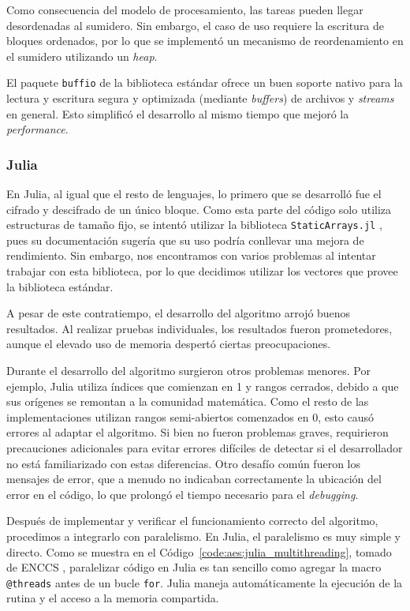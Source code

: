 \documentclass[11pt]{article}
\let\Oldsubsubsection\subsubsection
\renewcommand{\subsubsection}{\FloatBarrier\Oldsubsubsection}
\newcommand{\english}[1]{\textit{#1}}
\begin{document}
Como consecuencia del modelo de procesamiento, las tareas pueden llegar desordenadas al sumidero. Sin embargo, el caso de uso requiere la escritura de bloques ordenados, por lo que se implementó un mecanismo de reordenamiento en el sumidero utilizando un \english{heap}.

El paquete \lstinline{buffio} de la biblioteca estándar ofrece un buen soporte nativo para la lectura y escritura segura y optimizada (mediante \english{buffers}) de archivos y \english{streams} en general. Esto simplificó el desarrollo al mismo tiempo que mejoró la \english{performance}.

\subsubsection{Julia}

En Julia, al igual que el resto de lenguajes, lo primero que se desarrolló fue el cifrado y descifrado de un único bloque. Como esta parte del código solo utiliza estructuras de tamaño fijo, se intentó utilizar la biblioteca \lstinline{StaticArrays.jl} \cite{jl:lib:staticarrays}, pues su documentación sugería que su uso podría conllevar una mejora de rendimiento. Sin embargo, nos encontramos con varios problemas al intentar trabajar con esta biblioteca, por lo que decidimos utilizar los vectores que provee la biblioteca estándar.

A pesar de este contratiempo, el desarrollo del algoritmo arrojó buenos resultados. Al realizar pruebas individuales, los resultados fueron prometedores, aunque el elevado uso de memoria despertó ciertas preocupaciones.

Durante el desarrollo del algoritmo surgieron otros problemas menores. Por ejemplo, Julia utiliza índices que comienzan en 1 y rangos cerrados, debido a que sus orígenes se remontan a la comunidad matemática. Como el resto de las implementaciones utilizan rangos semi-abiertos comenzados en 0, esto causó errores al adaptar el algoritmo. Si bien no fueron problemas graves, requirieron precauciones adicionales para evitar errores difíciles de detectar si el desarrollador no está familiarizado con estas diferencias. Otro desafío común fueron los mensajes de error, que a menudo no indicaban correctamente la ubicación del error en el código, lo que prolongó el tiempo necesario para el \english{debugging}.

Después de implementar y verificar el funcionamiento correcto del algoritmo, procedimos a integrarlo con paralelismo. En Julia, el paralelismo es muy simple y directo. Como se muestra en el Código~\ref{code:aes:julia_multithreading}, tomado de ENCCS \cite{jl:ex:encss_jl_threading}, paralelizar código en Julia es tan sencillo como agregar la macro \lstinline{@threads} antes de un bucle \lstinline{for}. Julia maneja automáticamente la ejecución de la rutina y el acceso a la memoria compartida.
\end{document}

